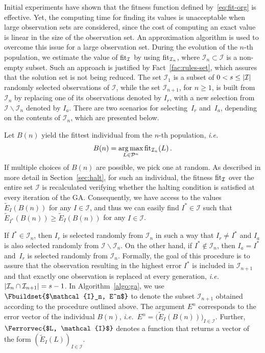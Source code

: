 Initial experiments have shown that the fitness function defined by~\eqref{eq:fit-org} is effective. Yet, the computing time for finding its values is unacceptable when large observation sets are considered, since the cost of computing an exact value is linear in the size of the observation set. An approximation algorithm is used to overcome this issue for a large observation set. During the evolution of the $n$-th population, we estimate the value of $\operatorname{fit}_{\mathcal{I}}$ by using $\operatorname{fit}_{\mathcal{I}_n}$, where $\mathcal{I}_n\subset\mathcal{I}$ is a non-empty subset. Such an approach is justified by Fact~\ref{fac:rules-set}, which assures that the solution set is not being reduced. The set $\mathcal{I}_1$ is a subset of $0<s\leq \lvert\mathcal{I}\rvert$ randomly selected observations of $\mathcal{I}$, while the set $\mathcal{I}_{n+1}$, for $n\geq 1$, is built from $\mathcal{I}_{n}$ by replacing one of its observations denoted by $I_r$, with a new selection from $\mathcal{I} \backslash \mathcal{I}_{n}$ denoted by $I_a$. There are two scenarios for selecting~$I_r$ and~$I_a$, depending on the contents of $\mathcal{I}_n$, which are presented below.

Let $B(n)$ yield the fittest individual from the $n$-th population, {\it i.e.}\
\begin{equation}
	B(n) = \operatorname*{arg\,max}_{L\in\mathcal{P}^{n}} \operatorname{fit}_{\mathcal{I}_{n}}(L)\,.
\end{equation}
If multiple choices of $B(n)$ are possible, we pick one at random.
As described in more detail in Section~\ref{sec:halt}, for such an individual, the fitness $\operatorname{fit}_{\mathcal{I}}$ over the entire set $\mathcal{I}$ is recalculated verifying  whether the halting condition is satisfied at every iteration of the GA. Consequently, we have access to the values $\widetilde{E}_I(B(n))$ for any $I\in\mathcal{I}$, and thus we can easily find $I^{\ast}\in\mathcal{I}$ such that $\widetilde{E}_{I^{\ast}}(B(n)) \geq \widetilde{E}_I(B(n))$ for any $I\in\mathcal{I}$.

If $I^{\ast} \in \mathcal{I}_{n}$, then $I_r$ is selected randomly from $\mathcal{I}_{n}$ in such a way that $I_r \neq I^{\ast}$ and $I_a$ is also selected randomly from $\mathcal{I}\backslash \mathcal{I}_{n}$. On the other hand, if $I^{\ast} \not\in \mathcal{I}_{n}$, then $I_a = I^{\ast}$ and~$I_r$ is selected randomly from $\mathcal{I}_{n}$. Formally, the goal of this procedure is to assure that the observation resulting in the highest error $I^{\ast}$ is included in $\mathcal{I}_{n+1}$ and that exactly one observation is replaced at every generation, \emph{i.e.}\ $\lvert\mathcal{I}_{n} \cap \mathcal{I}_{n+1}\rvert = s-1$.
In Algorithm~\ref{algo:ga}, we use $\Fbuildset{$\mathcal{I}_n, E^n$}$ to denote the subset $\mathcal{I}_{n+1}$ obtained according to the procedure outlined above. The argument $E^n$ corresponds to the error vector of the individual $B(n)$, \emph{i.e.}\ $E^n = \big(\widetilde{E}_I(B(n))\big)_{I\in\mathcal{I}}$. Further, $\Ferrorvec{$L, \mathcal{I}$}$ denotes a function that returns a vector of the form $(\widetilde{E}_{I}(L))_{I\in\mathcal{I}}$.

